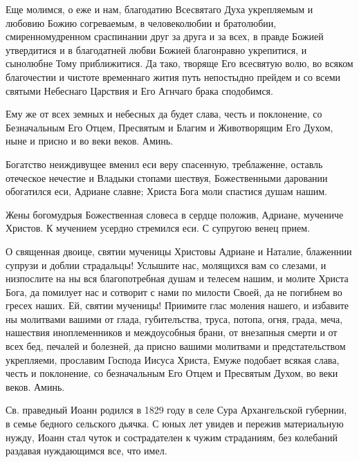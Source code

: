 Еще молимся, о еже и нам, благодатию Всесвятаго Духа укрепляемым и любовию Божию согреваемым, в человеколюбии и братолюбии, смиренномудренном сраспинании друг за друга и за всех, в правде Божией утвердитися и в благодатней любви Божией благонравно укрепитися, и сынолюбне Тому приближитися. Да тако, творяще Его всесвятую волю, во всяком благочестии и чистоте временнаго жития путь непостыдно прейдем и со всеми святыми Небеснаго Царствия и Его Агнчаго брака сподобимся. 


Ему же от всех земных и небесных да будет слава, честь и поклонение, со Безначальным Его Отцем, Пресвятым и Благим и Животворящим Его Духом, ныне и присно и во веки веков. Аминь.
\mychapterending

 


Богатство неиждивущее вменил еси веру спасенную, треблаженне, оставль отеческое нечестие и Владыки стопами шествуя, Божественными даровании обогатился еси, Адриане славне; Христа Бога моли спастися душам нашим.




Жены богомудрыя Божественная словеса в сердце положив, Адриане, мучениче Христов. К мучением усердно стремился еси. С супругою венец прием.




О священная двоице, святии мученицы Христовы Адриане и Наталие, блаженнии супрузи и доблии страдальцы! Услышите нас, молящихся вам со слезами, и низпослите на ны вся благопотребная душам и телесем нашим, и молите Христа Бога, да помилует нас и сотворит с нами по милости Своей, да не погибнем во гресех наших. Ей, святии мученицы! Приимите глас моления нашего, и избавите ны молитвами вашими от глада, губителъства, труса, потопа, огня, града, меча, нашествия иноплеменников и междоусобныя брани, от внезапныя смерти и от всех бед, печалей и болезней, да присно вашими молитвами и предстательством укрепляеми, прославим Господа Иисуса Христа, Емуже подобает всякая слава, честь и поклонение, со безначальным Его Отцем и Пресвятым Духом, во веки веков. Аминь.\mychapterending

 
Св. праведный Иоанн родился в 1829 году в селе Сура Архангельской губернии, в семье бедного сельского дьячка. С юных лет увидев и пережив материальную нужду, Иоанн стал чуток и сострадателен к чужим страданиям, без колебаний раздавая нуждающимся все, что имел. 


